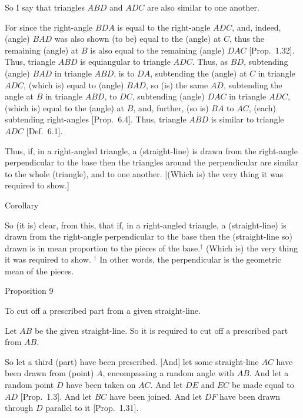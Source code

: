  So I say that triangles $ABD$ and $ADC$ are also similar to one another.
 
 For since the right-angle $BDA$ is equal to the right-angle $ADC$, and, indeed,
 (angle) $BAD$ was also shown (to be) equal to the (angle) at $C$, thus the
 remaining (angle) at $B$ is also equal to the remaining (angle) $DAC$ 
 [Prop.~1.32].
  Thus, triangle $ABD$ is equiangular to triangle $ADC$.
 Thus, as $BD$, subtending (angle) $BAD$ in triangle $ABD$, is to
 $DA$, subtending the (angle) at $C$ in triangle $ADC$, (which is) equal to (angle) $BAD$, so (is) the
 same $AD$, subtending the angle at $B$ in triangle $ABD$, to $DC$, subtending
 (angle) $DAC$ in triangle $ADC$, (which is) equal to the (angle) at $B$,
 and, further, (so is) $BA$ to $AC$, (each) subtending  right-angles [Prop.~6.4]. Thus, triangle $ABD$ is similar to
 triangle $ADC$  [Def.~6.1].
 
 Thus,  if, in a right-angled triangle, a (straight-line) is drawn from the right-angle perpendicular
to the base then the triangles around the perpendicular are similar to
the whole (triangle), and to one another. [(Which is) the very thing it
was required to show.]\\

\begin{center}
{\large Corollary}
\end{center}\vspace*{-7pt}

So (it is) clear, from this, that if, in a right-angled triangle, a
(straight-line) is drawn from the right-angle perpendicular to the base then the (straight-line so)
drawn is in mean proportion to the pieces of the base.$^\dag$ (Which
is) the very thing it was required to show.
{\footnotesize \noindent$^\dag$ In other words, the perpendicular is the geometric mean of the pieces.} 


\begin{center}
{\large Proposition 9}
\end{center}

To cut off a prescribed part from a given straight-line.

\epsfysize=1.8in
\centerline{}

Let $AB$ be the given straight-line. So it is required to cut off a prescribed
part from $AB$.

So let a third (part) have been prescribed. [And] let some straight-line $AC$
have been drawn from (point) $A$, encompassing a random angle with
$AB$.  And let a random point $D$ have been taken on $AC$. And let
$DE$ and $EC$ be made equal to $AD$ [Prop.~1.3]. And let $BC$ have been
joined. And let $DF$ have been drawn through $D$ parallel to it [Prop.~1.31].

